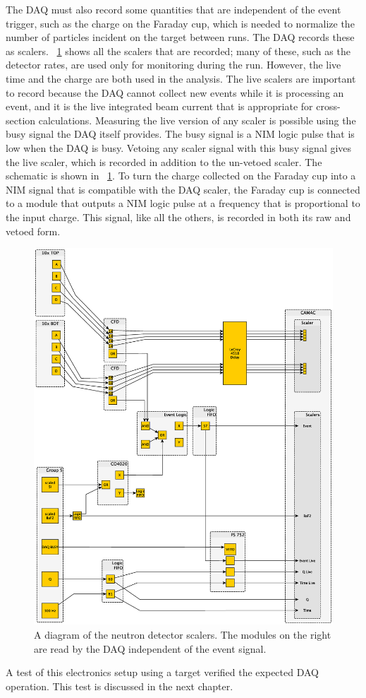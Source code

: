 The DAQ must also record some quantities that are independent of the event trigger, such as the charge on the Faraday cup, which is needed to normalize the number of particles incident on the target between runs.  The DAQ records these as scalers.  {\fig}~\ref{fig:scalerElectronics} shows all the scalers that are recorded; many of these, such as the detector rates, are used only for monitoring during the run.  However, the live time and the charge are both used in the analysis.  The live scalers are important to record because the DAQ cannot collect new events while it is processing an event, and it is the live integrated beam current that is appropriate for cross-section calculations.  Measuring the live version of any scaler is possible using the busy signal the DAQ itself provides.  The busy signal is a NIM logic pulse that is low when the DAQ is busy.  Vetoing any scaler signal with this busy signal gives the live scaler, which is recorded in addition to the un-vetoed scaler.  The schematic is shown in {\fig}~\ref{fig:scalerElectronics}.  To turn the charge collected on the Faraday cup into a NIM signal that is compatible with the DAQ scaler, the Faraday cup is connected to a module that outputs a NIM logic pulse at a frequency that is proportional to the input charge.  This signal, like all the others, is recorded in both its raw and vetoed form.
\begin{figure}[htp]
\centering
\includegraphics[width=1.0\textwidth]{figures/electronics_scalers.eps}
\caption{A diagram of the neutron detector scalers.  The modules on the right are read by the DAQ independent of the event signal.}
\label{fig:scalerElectronics}
\end{figure}
A test of this electronics setup using a  target verified the expected DAQ operation.  This test is discussed in the next chapter. 

%
% 
% 
